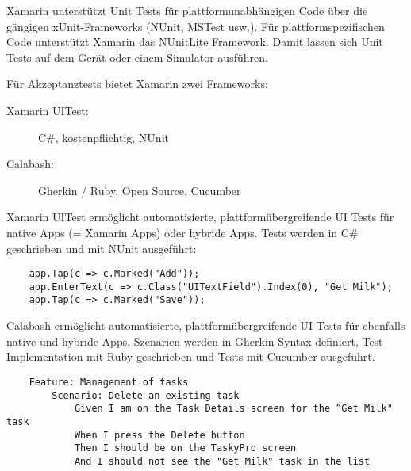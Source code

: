 Xamarin unterstützt Unit Tests für plattformunabhängigen Code über die gängigen xUnit-Frameworks (NUnit, MSTest usw.). Für plattformspezifischen Code unterstützt Xamarin das NUnitLite Framework. Damit lassen sich Unit Tests auf dem Gerät oder einem Simulator ausführen.

Für Akzeptanztests bietet Xamarin zwei Frameworks:
\begin{description}
	\item[Xamarin UITest:] C\#, kostenpflichtig, NUnit
	\item[Calabash:] Gherkin / Ruby, Open Source, Cucumber
\end{description}
Xamarin UITest ermöglicht automatisierte, plattformübergreifende UI Tests für native Apps (= Xamarin Apps) oder hybride Apps. Tests werden in C\# geschrieben und mit NUnit ausgeführt:
\begin{verbatim}
	app.Tap(c => c.Marked("Add"));
	app.EnterText(c => c.Class("UITextField").Index(0), "Get Milk");
	app.Tap(c => c.Marked("Save"));
\end{verbatim}

Calabash ermöglicht automatisierte, plattformübergreifende UI Tests für ebenfalls native und hybride Apps. Szenarien werden in Gherkin Syntax definiert, Test Implementation mit Ruby geschrieben und Tests mit Cucumber ausgeführt.

\begin{verbatim}
	Feature: Management of tasks
		Scenario: Delete an existing task
			Given I am on the Task Details screen for the ”Get Milk" task
			When I press the Delete button
			Then I should be on the TaskyPro screen
			And I should not see the "Get Milk" task in the list
\end{verbatim}